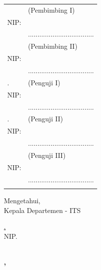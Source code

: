 \noindent
\begin{tabularx}{\textwidth}{X l}
  \advisor{}               & (Pembimbing I)                      \\
  NIP: \advisornip{}       &                                     \\
                           & ................................... \\
  \coadvisor{}             & (Pembimbing II)                     \\
  NIP: \coadvisornip{}     &                                     \\
                           & ................................... \\
  \examinerone{}.          & (Penguji I)                         \\
  NIP: \examineronenip{}   &                                     \\
                           & ................................... \\
  \examinertwo{}.          & (Penguji II)                        \\
  NIP: \examinertwonip{}   &                                     \\
                           & ................................... \\
\ifbool{bpenguji3}{
  \examinerthree{}.        & (Penguji III)                       \\
  NIP: \examinerthreenip{} &                                     \\
                          & ................................... \\
}{}


\end{tabularx}
\endgroup
\vspace{-1ex}
\begin{center}
  Mengetahui, \\
  Kepala Departemen \department{} \facultyshort{} - ITS\\

  \vspace{5ex}

  \underline{\headofdepartment{}.} \\
  NIP. \headofdepartmentnip{}
\end{center}
\vspace{-1ex}
\begin{center}
  \textbf{\MakeUppercase{\place{}}\\\MONTH{}, \the\year{}}
\end{center}
\endgroup
